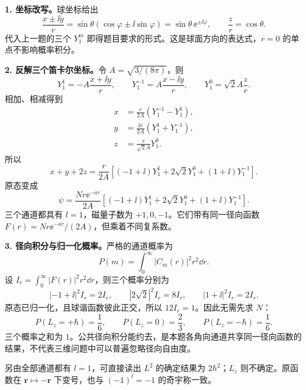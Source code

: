 \begin{checkedsolution}
\textbf{1. 坐标改写。}球坐标给出
\begin{equation}
  \frac{x\pm\ii y}{r}
    =\sin\theta(\cos\varphi\pm\ii\sin\varphi)
    =\sin\theta\,\ee^{\pm\ii\varphi},
  \qquad \frac zr=\cos\theta.
\end{equation}
代入上一题的三个 $Y_1^m$ 即得题目要求的形式。这是球面方向的表达式，$r=0$ 的单点不影响概率积分。

\textbf{2. 反解三个笛卡尔坐标。}令 $A=\sqrt{3/(8\pi)}$，则
\begin{equation}
  Y_1^1=-A\frac{x+\ii y}{r},\qquad
  Y_1^{-1}=A\frac{x-\ii y}{r},\qquad
  Y_1^0=\sqrt2 A\frac zr.
\end{equation}
相加、相减得到
\begin{equation}
  \boxed{\begin{aligned}
    x&=\frac r{2A}(Y_1^{-1}-Y_1^1),\\
    y&=\frac{\ii r}{2A}(Y_1^1+Y_1^{-1}),\\
    z&=\frac r{\sqrt2 A}Y_1^0.
  \end{aligned}}
\end{equation}
所以
\begin{equation}
  x+y+2z=\frac r{2A}
     \left[(-1+\ii)Y_1^1+2\sqrt2Y_1^0+(1+\ii)Y_1^{-1}\right].
\end{equation}
原态变成
\begin{equation}
  \boxed{\psi=\frac{Nr\ee^{-ar}}{2A}
     \left[(-1+\ii)Y_1^1+2\sqrt2Y_1^0+(1+\ii)Y_1^{-1}\right].}
\end{equation}
三个通道都具有 $l=1$，磁量子数为 $+1,0,-1$。它们带有同一径向函数
$F(r)=Nr\ee^{-ar}/(2A)$，但乘着不同复系数。

\textbf{3. 径向积分与归一化概率。}严格的通道概率为
\begin{equation}
  P(m)=\int_0^\infty|C_m(r)|^2r^2\dd r.
\end{equation}
设 $I_r=\int_0^\infty|F(r)|^2r^2\dd r$，则三个概率分别为
\begin{equation}
  |-1+\ii|^2I_r=2I_r,\qquad
  |2\sqrt2|^2I_r=8I_r,\qquad
  |1+\ii|^2I_r=2I_r.
\end{equation}
原态已归一化，且球谐函数彼此正交，所以 $12I_r=1$。因此无需先求 $N$：
\begin{equation}
  \boxed{P(L_z=+\hbar)=\frac16,\qquad
    P(L_z=0)=\frac23,\qquad
    P(L_z=-\hbar)=\frac16.}
\end{equation}
三个概率之和为 $1$。公共径向积分能约去，是本题各角向通道共享同一径向函数的结果，不代表三维问题中可以普遍忽略径向自由度。

另由全部通道都有 $l=1$，可直接读出 $L^2$ 的确定结果为 $2\hbar^2$；$L_z$ 则不确定。原函数在 $\mathbf r\mapsto-\mathbf r$ 下变号，也与 $(-1)^l=-1$ 的奇宇称一致。
\end{checkedsolution}

